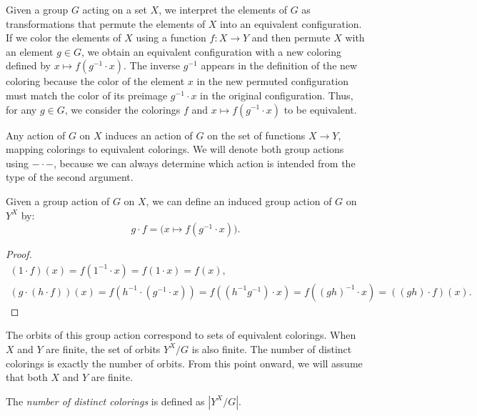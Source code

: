 Given a group $G$ acting on a set $X$, we interpret the elements of $G$ as transformations that permute the elements of $X$ into an equivalent configuration. If we color the elements of $X$ using a function $f : X \to Y$ and then permute $X$ with an element $g \in G$, we obtain an equivalent configuration with a new coloring defined by $x \mapsto f(g^{-1} \cdot x)$. The inverse $g^{-1}$ appears in the definition of the new coloring because the color of the element $x$ in the new permuted configuration must match the color of its preimage $g^{-1} \cdot x$ in the original configuration. Thus, for any $g \in G$, we consider the colorings $f$ and $x \mapsto f(g^{-1} \cdot x)$ to be equivalent.

Any action of $G$ on $X$ induces an action of $G$ on the set of functions $X \to Y$, mapping colorings to equivalent colorings. We will denote both group actions using ${-} \cdot {-}$, because we can always determine which action is intended from the type of the second argument.
\begin{proposition}
  \label{prop:mul-action-colorings}
  \leanok
  Given a group action of $G$ on $X$, we can define an induced group action of $G$ on $Y^X$ by:
  \begin{equation*}
    g \cdot f = \big(x \mapsto f(g^{-1} \cdot x)\big).
  \end{equation*}
\end{proposition}

\begin{proof}
  \leanok
  \begin{gather*}
    (1 \cdot f)(x) = f(1^{-1} \cdot x) = f(1 \cdot x) = f(x), \\
    (g \cdot (h \cdot f))(x) = f(h^{-1} \cdot (g^{-1} \cdot x)) = f((h^{-1}g^{-1}) \cdot x) = f((gh)^{-1} \cdot x) = ((gh) \cdot f)(x).
  \end{gather*}
\end{proof}

The orbits of this group action correspond to sets of equivalent colorings. When $X$ and $Y$ are finite, the set of orbits $Y^X/G$ is also finite. The number of distinct colorings is exactly the number of orbits. From this point onward, we will assume that both $X$ and $Y$ are finite.

\begin{definition}
  \label{def:distinct-colorings}
  \leanok
  The \emph{number of distinct colorings} is defined as $|Y^X/G|$.
\end{definition}


